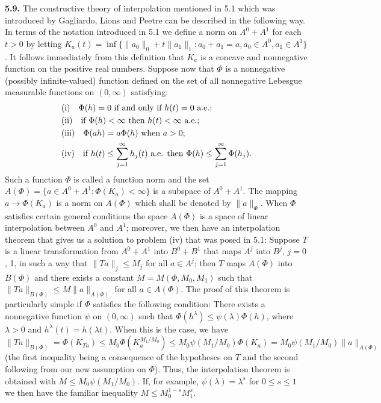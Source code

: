 \textbf{5.9.} The constructive theory of interpolation mentioned in 5.1 which
was introduced by Gagliardo, Lions and Peetre can be described in the following
way. In terms of the notation introduced in 5.1 we define a norm on
$A^{0} + A^{1}$ for each $t > 0$ by letting
$K_{a}(t) = \inf\{\|a_{0}\|_{0} + t\|a_{1}\|_{1} : a_{0} + a_{1} = a, a_{0} \in A^{0}, a_{1} \in A^{1}\}$.
It follows immediately from this definition that $K_{a}$ is a concave and
nonnegative function on the positive real numbers. Suppose now that $\Phi$ is
a nonnegative (possibly infinite-valued) function defined on the set of all
nonnegative Lebesgue measurable functions on $(0, \infty)$ satisfying:
\[
\begin{aligned}
&\textup{(i)}\quad \Phi(h)=0 \text{ if and only if } h(t)=0 \text{ a.e.};\\
&\textup{(ii)}\quad \text{if } \Phi(h)<\infty \text{ then } h(t)<\infty \text{ a.e.};\\
&\textup{(iii)}\quad \Phi(ah)=a\Phi(h) \text{ when } a>0;\\
&\textup{(iv)}\quad \text{if } h(t)\leq\sum_{j=1}^{\infty}h_{j}(t) \text{ a.e. then } \Phi(h)\leq\sum_{j=1}^{\infty}\Phi(h_{j}).
\end{aligned}
\]
Such a function $\Phi$ is called a function norm and the set
$A(\Phi) = \{a \in A^{0} + A^{1} : \Phi(K_{a}) < \infty\}$ is a subspace of
$A^{0} + A^{1}$. The mapping $a \to \Phi(K_{a})$ is a norm on $A(\Phi)$ which
shall be denoted by $\|a\|_{\Phi}$. When $\Phi$ satisfies certain general
conditions the space $A(\Phi)$ is a space of linear interpolation between
$A^{0}$ and $A^{1}$; moreover, we then have an interpolation theorem that gives
us a solution to problem (iv) that was posed in 5.1: Suppose $T$ is a linear
transformation from $A^{0} + A^{1}$ into $B^{0} + B^{1}$ that maps $A^{j}$ into
$B^{j}$, $j = 0$, 1, in such a way that $\|Ta\|_{j} \leq M_{j}$ for all
$a \in A^{j}$; then $T$ maps $A(\Phi)$ into $B(\Phi)$ and there exists a
constant $M = M(\Phi, M_{0}, M_{1})$ such that $\|Ta\|_{B(\Phi)} \leq M\|a\|_{A(\Phi)}$
for all $a \in A(\Phi)$. The proof of this theorem is particularly simple if
$\Phi$ satisfies the following condition: There exists a nonnegative function
$\psi$ on $(0, \infty)$ such that $\Phi(h^{\lambda}) \leq \psi(\lambda)\Phi(h)$,
where $\lambda > 0$ and $h^{\lambda}(t) = h(\lambda t)$. When this is the case,
we have $\|Ta\|_{B(\Phi)} = \Phi(K_{Ta}) \leq M_{0}\Phi(K_{a}^{M_{1}/M_{0}})
\leq M_{0}\psi(M_{1}/M_{0})\Phi(K_{a}) = M_{0}\psi(M_{1}/M_{0})\|a\|_{A(\Phi)}$
(the first inequality being a consequence of the hypotheses on $T$ and the
second following from our new assumption on $\Phi$). Thus, the interpolation
theorem is obtained with $M \leq M_{0}\psi(M_{1}/M_{0})$. If, for example,
$\psi(\lambda) = \lambda^{s}$ for $0 \leq s \leq 1$ we then have the familiar
inequality $M \leq M_{0}^{1-s}M_{1}^{s}$.

